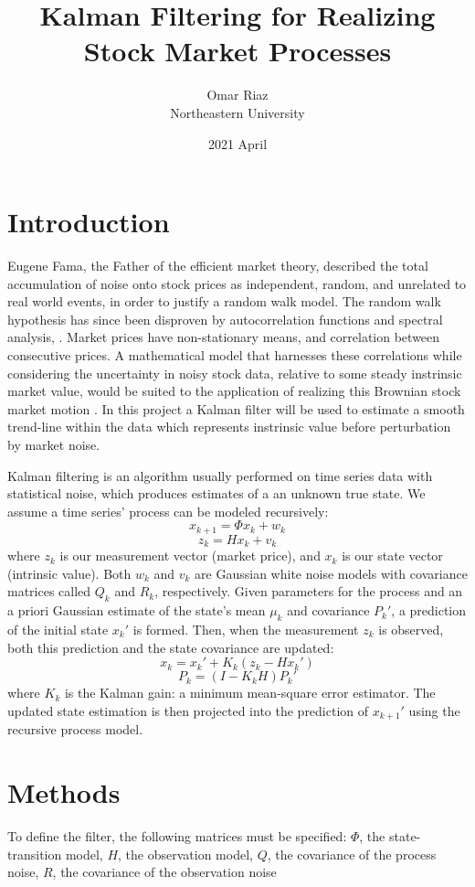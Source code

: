 \documentclass[12pt, letterpaper]{article}
\title{Kalman Filtering for Realizing Stock Market Processes}
\author{Omar Riaz \\ Northeastern University}
\date{2021 April}
\begin{document}
\maketitle
\section{Introduction}
Eugene Fama, the Father of the efficient market theory, described the total accumulation of noise onto stock prices as independent, random, and unrelated to real world events, in order to justify a random walk model. The random walk hypothesis has since been disproven by autocorrelation functions and spectral analysis, \cite{rankin}. Market prices have non-stationary means, and correlation between consecutive prices. A mathematical model that harnesses these correlations while considering the uncertainty in noisy stock data, relative to some steady instrinsic market value, would be suited to the application of realizing this Brownian stock market motion \cite{martinelli}. In this project a Kalman filter will be used to estimate a smooth trend-line within the data which represents instrinsic value before perturbation by market noise. \cite{arnold}

Kalman filtering is an algorithm usually performed on time series data with statistical noise, which produces estimates of a an unknown true state.  We assume a time series' process can be modeled recursively:
\[x_{k+1} = \Phi x_k + w_k\]
\[z_k = Hx_k + v_k\]
where $z_k$ is our measurement vector (market price), and $x_k$ is our state vector (intrinsic value). Both $w_k$ and $v_k$ are Gaussian white noise models with covariance matrices called $Q_k$ and $R_k$, respectively. Given  parameters for the process and an a priori Gaussian estimate of the state's mean $\mu_k$ and covariance $P_k'$, a prediction of the initial state $x_k'$ is formed. Then, when the measurement $z_k$ is observed, both this prediction and the state covariance are updated:
\[x_k = x_k' + K_k(z_k - Hx_k')\]
\[P_k  = (I - K_kH)P_k'\]
where $K_k$ is the Kalman gain: a minimum mean-square error estimator. The updated state estimation is then projected into the prediction of $x_{k+1}'$ using the recursive process model. 


\section{Methods}

To define the filter, the following matrices must be specified:
$\Phi$, the state-transition model,
$H$, the observation model,
$Q$, the covariance of the process noise,
$R$, the covariance of the observation noise
\end{document}
